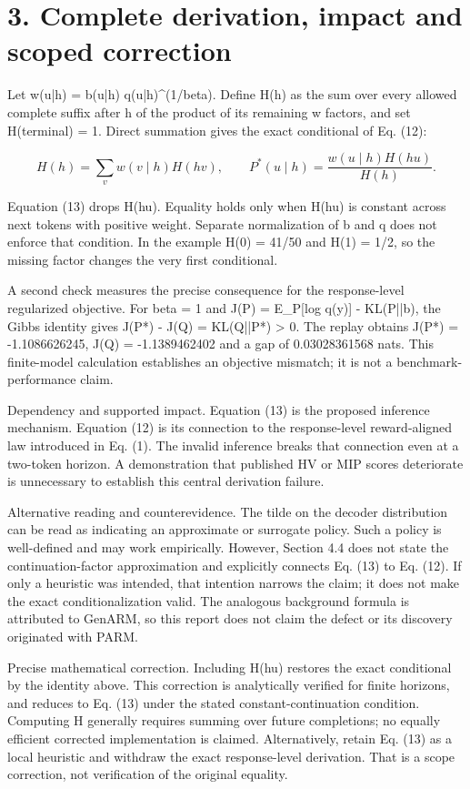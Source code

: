 \documentclass[10pt]{article}
\begin{document}
\section*{3. Complete derivation, impact and scoped correction}
Let w(u|h) = b(u|h) q(u|h)\textasciicircum{}(1/beta). Define H(h) as the sum over every allowed complete suffix after h of the product of its remaining w factors, and set H(terminal) = 1. Direct summation gives the exact conditional of Eq. (12):\par
\[H(h)=\sum_v w(v\mid h)H(hv),\qquad P^*(u\mid h)=\frac{w(u\mid h)H(hu)}{H(h)}.\]\par
Equation (13) drops H(hu). Equality holds only when H(hu) is constant across next tokens with positive weight. Separate normalization of b and q does not enforce that condition. In the example H(0) = 41/50 and H(1) = 1/2, so the missing factor changes the very first conditional.\par
A second check measures the precise consequence for the response-level regularized objective. For beta = 1 and J(P) = E\_P[log q(y)] - KL(P||b), the Gibbs identity gives J(P*) - J(Q) = KL(Q||P*) > 0. The replay obtains J(P*) = -1.1086626245, J(Q) = -1.1389462402 and a gap of 0.03028361568 nats. This finite-model calculation establishes an objective mismatch; it is not a benchmark-performance claim.\par
Dependency and supported impact. Equation (13) is the proposed inference mechanism. Equation (12) is its connection to the response-level reward-aligned law introduced in Eq. (1). The invalid inference breaks that connection even at a two-token horizon. A demonstration that published HV or MIP scores deteriorate is unnecessary to establish this central derivation failure.\par
Alternative reading and counterevidence. The tilde on the decoder distribution can be read as indicating an approximate or surrogate policy. Such a policy is well-defined and may work empirically. However, Section 4.4 does not state the continuation-factor approximation and explicitly connects Eq. (13) to Eq. (12). If only a heuristic was intended, that intention narrows the claim; it does not make the exact conditionalization valid. The analogous background formula is attributed to GenARM, so this report does not claim the defect or its discovery originated with PARM.\par
Precise mathematical correction. Including H(hu) restores the exact conditional by the identity above. This correction is analytically verified for finite horizons, and reduces to Eq. (13) under the stated constant-continuation condition. Computing H generally requires summing over future completions; no equally efficient corrected implementation is claimed. Alternatively, retain Eq. (13) as a local heuristic and withdraw the exact response-level derivation. That is a scope correction, not verification of the original equality.\par
\end{document}
